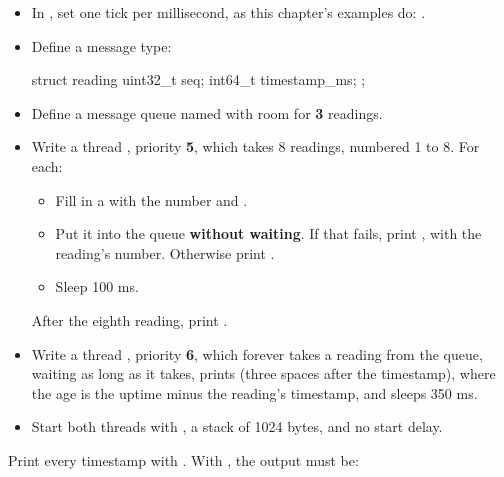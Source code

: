 \begin{itemize}
  \item In , set one tick per millisecond, as this chapter’s examples do:
    .
  \item Define a message type:
\begin{ccode}
struct reading {
  uint32_t seq;
  int64_t timestamp_ms;
};
\end{ccode}
  \item Define a message queue named  with room for \textbf{3} readings.
  \item Write a thread , priority \textbf{5}, which takes 8 readings, numbered 1 to 8. For
    each:
\begin{itemize}
  \item Fill in a  with the number and .
  \item Put it into the queue \textbf{without waiting}. If that fails, print , with the reading’s number. Otherwise print .
  \item Sleep 100 ms.
\end{itemize}
After the eighth reading, print .
  \item Write a thread , priority \textbf{6}, which forever takes a reading from the queue,
    waiting as long as it takes, prints  (three spaces after
    the timestamp), where the age is the uptime minus the reading’s timestamp, and sleeps 350 ms.
  \item Start both threads with , a stack of 1024 bytes, and no start delay.
\end{itemize}

Print every timestamp with . With , the output must be:


